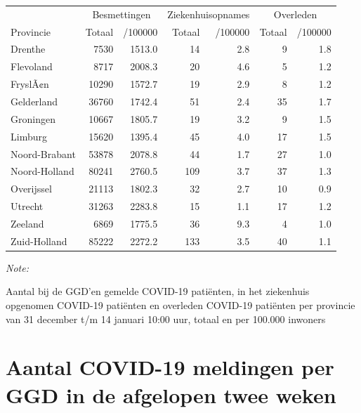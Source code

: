 \documentclass[
  english,
  man,floatsintext]{apa6}
\begin{document}
\begin{table}
\centering
\begin{threeparttable}
\begin{tabular}{lrrrrrr}
\toprule
\multicolumn{1}{c}{ } & \multicolumn{2}{c}{Besmettingen} & \multicolumn{2}{c}{Ziekenhuisopnames} & \multicolumn{2}{c}{Overleden} \\
\cmidrule(l{3pt}r{3pt}){2-3} \cmidrule(l{3pt}r{3pt}){4-5} \cmidrule(l{3pt}r{3pt}){6-7}
Provincie & Totaal & /100000 & Totaal & /100000 & Totaal & /100000\\
\midrule
Drenthe & 7530 & 1513.0 & 14 & 2.8 & 9 & 1.8\\
Flevoland & 8717 & 2008.3 & 20 & 4.6 & 5 & 1.2\\
FryslÃ¢n & 10290 & 1572.7 & 19 & 2.9 & 8 & 1.2\\
Gelderland & 36760 & 1742.4 & 51 & 2.4 & 35 & 1.7\\
Groningen & 10667 & 1805.7 & 19 & 3.2 & 9 & 1.5\\
Limburg & 15620 & 1395.4 & 45 & 4.0 & 17 & 1.5\\
Noord-Brabant & 53878 & 2078.8 & 44 & 1.7 & 27 & 1.0\\
Noord-Holland & 80241 & 2760.5 & 109 & 3.7 & 37 & 1.3\\
Overijssel & 21113 & 1802.3 & 32 & 2.7 & 10 & 0.9\\
Utrecht & 31263 & 2283.8 & 15 & 1.1 & 17 & 1.2\\
Zeeland & 6869 & 1775.5 & 36 & 9.3 & 4 & 1.0\\
Zuid-Holland & 85222 & 2272.2 & 133 & 3.5 & 40 & 1.1\\
\bottomrule
\end{tabular}
\begin{tablenotes}
\item \textit{Note: } 
\item Aantal bij de GGD’en gemelde COVID-19 patiënten, in het ziekenhuis opgenomen COVID-19 patiënten en overleden COVID-19 patiënten per provincie van 31 december t/m 14 januari 10:00 uur, totaal en per 100.000 inwoners
\end{tablenotes}
\end{threeparttable}
\end{table}

\newpage

\hypertarget{aantal-covid-19-meldingen-per-ggd-in-de-afgelopen-twee-weken}{%
\section{Aantal COVID-19 meldingen per GGD in de afgelopen twee weken}\label{aantal-covid-19-meldingen-per-ggd-in-de-afgelopen-twee-weken}}
\end{document}
